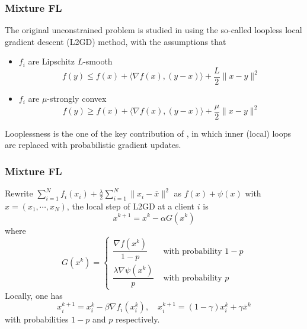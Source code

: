 
\begin{frame}
\frametitle{Mixture FL}

The original unconstrained problem is studied in \cite{hanzely2020federated} using the so-called {\color{red} loopless} local gradient descent (L2GD) method, with the assumptions that
\begin{itemize}
    \item $f_i$ are Lipschitz $L$-smooth
    $$f(y) \leqslant f(x) + \langle \nabla f(x), (y-x)\rangle + \dfrac{L}{2} \lVert x-y \rVert^2$$
    \item $f_i$ are $\mu$-strongly convex
    $$f(y) \geqslant f(x) + \langle \nabla f(x), (y-x)\rangle + \dfrac{\mu}{2} \lVert x-y \rVert^2$$
\end{itemize}

{\color{red} Looplessness} is the one of the key contribution of \cite{hanzely2020federated}, in which inner (local) loops are replaced with probabilistic gradient updates.

\end{frame}


\begin{frame}
\frametitle{Mixture FL}

Rewrite $\sum\limits_{i=1}^N f_i(x_i) + \frac{\lambda}{2} \sum\limits_{i=1}^N \lVert x_i - \overline{x} \rVert^2$ as $f(x) + \psi(x)$ with $x = (x_1,\cdots,x_N)$, the local step of L2GD at a client $i$ is
$$x^{k+1} = x^k - \alpha G(x^k)$$
where
$$
G(x^k) = \begin{cases}
\dfrac{\nabla f(x^k)}{1-p} & \text{ with probability } 1-p \\
\dfrac{\lambda \nabla \psi(x^k)}{p} & \text{ with probability } p 
\end{cases}
$$
Locally, one has
$$x_i^{k+1} = x_i^k - \beta \nabla f_i(x_i^k), \quad x_i^{k+1} = (1-\gamma)x_i^k + \gamma \overline{x}^k$$
with probabilities $1-p$ and $p$ respectively.

\end{frame}


